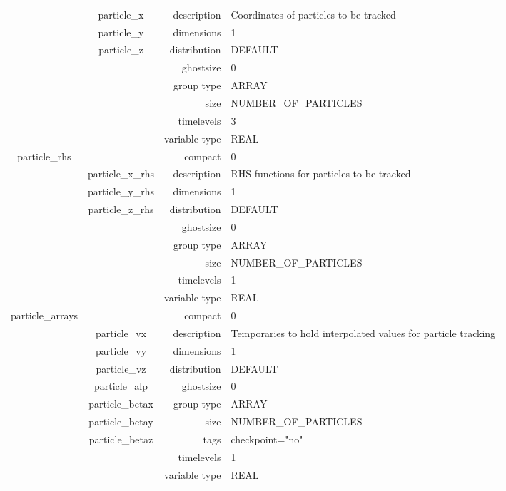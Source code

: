 \documentclass{article}
\begin{document}
\begin{tabular*}{150mm}{|c|c@{\extracolsep{\fill}}|rl|}
 & particle\_x & description & Coordinates of particles to be tracked \\ 
 & particle\_y & dimensions & 1 \\ 
 & particle\_z & distribution & DEFAULT \\ 
 &  & ghostsize & 0 \\ 
 &  & group type & ARRAY \\ 
 &  & size & NUMBER\_OF\_PARTICLES \\ 
 &  & timelevels & 3 \\ 
 &  & variable type & REAL \\ 
\hline 
particle\_rhs &  & compact & 0 \\ 
 & particle\_x\_rhs & description & RHS functions for particles to be tracked \\ 
 & particle\_y\_rhs & dimensions & 1 \\ 
 & particle\_z\_rhs & distribution & DEFAULT \\ 
 &  & ghostsize & 0 \\ 
 &  & group type & ARRAY \\ 
 &  & size & NUMBER\_OF\_PARTICLES \\ 
 &  & timelevels & 1 \\ 
 &  & variable type & REAL \\ 
\hline 
particle\_arrays &  & compact & 0 \\ 
 & particle\_vx & description & Temporaries to hold interpolated values for particle tracking \\ 
 & particle\_vy & dimensions & 1 \\ 
 & particle\_vz & distribution & DEFAULT \\ 
 & particle\_alp & ghostsize & 0 \\ 
 & particle\_betax & group type & ARRAY \\ 
 & particle\_betay & size & NUMBER\_OF\_PARTICLES \\ 
 & particle\_betaz & tags & checkpoint="no" \\ 
 &  & timelevels & 1 \\ 
 &  & variable type & REAL \\ 
\hline 
\end{tabular*} 



\vspace{5mm}
\vspace{5mm}
\end{document}

